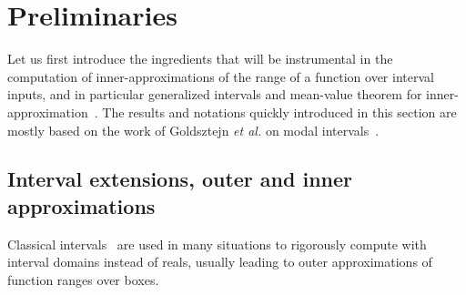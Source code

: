 \documentclass{sig-alternate-05-2015} %
\newcommand\ForAuthors[1]%
 {\par\smallskip                     %
  \begin{center}%
   \fbox%
   {\parbox{0.9\linewidth}%
    {\raggedright\sc--- #1}%
   }%
  \end{center}%
  \par\smallskip                     %
 }
\begin{document}








\section{Preliminaries}
\label{prelim}

Let us first introduce the ingredients that will be instrumental in the computation of inner-approximations of
the range of a function over interval inputs, and in particular
generalized intervals and mean-value theorem for inner-approximation~\label{generalized}. 
The results and notations quickly introduced in this section are mostly based on the work of Goldsztejn {\it et al.} 
on modal intervals~\cite{gold1}. 

\subsection{Interval extensions, outer and inner approximations}
Classical intervals~\cite{Moore66,IA2001} are used in many situations to rigorously compute with interval
domains instead of reals, usually leading to outer approximations of function
ranges over boxes. 
\end{document}
